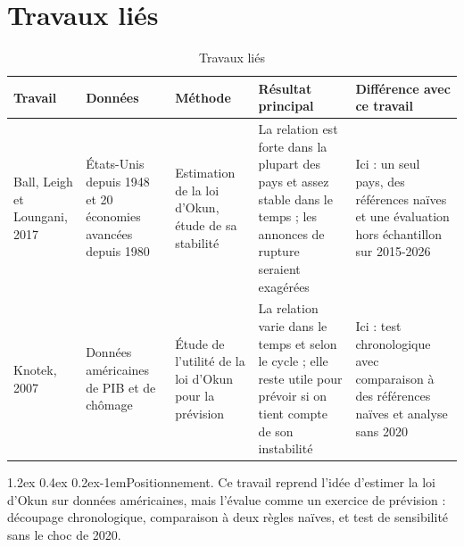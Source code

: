 \documentclass[11pt,a4paper]{article}
\makeatletter
\renewcommand\paragraph{\@startsection{paragraph}{4}{\z@}%
  {1.2ex \@plus 0.4ex \@minus 0.2ex}{-1em}{\normalfont\normalsize\bfseries}}
\makeatother
\begin{document}
\section{Travaux liés}
\label{sec:travaux}
\begin{table}[htbp]
  \centering
  \caption{Travaux liés}
  \label{tab:travaux}
  \small
  \begin{tabular}{@{}P{2.4cm} P{2.8cm} P{2.8cm} P{3.4cm} P{3.8cm}@{}}
    \toprule
    Travail & Données & Méthode & Résultat principal & Différence avec ce travail \\
    \midrule
    Ball, Leigh et Loungani, 2017~\cite{ball} & États-Unis depuis 1948 et 20 économies avancées depuis 1980 & Estimation de la loi d'Okun, étude de sa stabilité & La relation est forte dans la plupart des pays et assez stable dans le temps ; les annonces de rupture seraient exagérées & Ici : un seul pays, des références naïves et une évaluation hors échantillon sur 2015-2026 \\
    Knotek, 2007~\cite{knotek} & Données américaines de PIB et de chômage & Étude de l'utilité de la loi d'Okun pour la prévision & La relation varie dans le temps et selon le cycle ; elle reste utile pour prévoir si on tient compte de son instabilité & Ici : test chronologique avec comparaison à des références naïves et analyse sans 2020 \\
    \bottomrule
  \end{tabular}
\end{table}

\paragraph{Positionnement.} Ce travail reprend l'idée d'estimer la loi d'Okun sur données américaines, mais l'évalue comme un exercice de prévision : découpage chronologique, comparaison à deux règles naïves, et test de sensibilité sans le choc de 2020.

\end{document}
